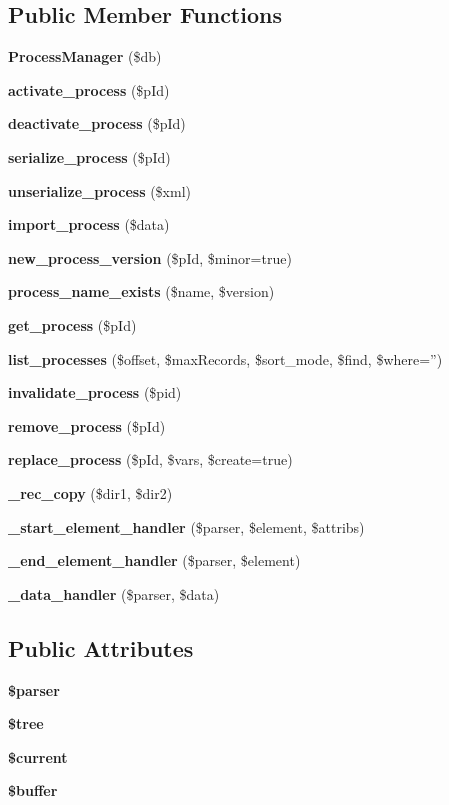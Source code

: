 \subsection*{Public Member Functions}
\begin{CompactItemize}
\item 
{\bf Process\-Manager} (\$db)
\item 
{\bf activate\_\-process} (\$p\-Id)
\item 
{\bf deactivate\_\-process} (\$p\-Id)
\item 
{\bf serialize\_\-process} (\$p\-Id)
\item 
{\bf unserialize\_\-process} (\$xml)
\item 
{\bf import\_\-process} (\$data)
\item 
{\bf new\_\-process\_\-version} (\$p\-Id, \$minor=true)
\item 
{\bf process\_\-name\_\-exists} (\$name, \$version)
\item 
{\bf get\_\-process} (\$p\-Id)
\item 
{\bf list\_\-processes} (\$offset, \$max\-Records, \$sort\_\-mode, \$find, \$where='')
\item 
{\bf invalidate\_\-process} (\$pid)
\item 
{\bf remove\_\-process} (\$p\-Id)
\item 
{\bf replace\_\-process} (\$p\-Id, \$vars, \$create=true)
\item 
{\bf \_\-rec\_\-copy} (\$dir1, \$dir2)\label{classProcessManager_a13}

\item 
{\bf \_\-start\_\-element\_\-handler} (\$parser, \$element, \$attribs)\label{classProcessManager_a14}

\item 
{\bf \_\-end\_\-element\_\-handler} (\$parser, \$element)\label{classProcessManager_a15}

\item 
{\bf \_\-data\_\-handler} (\$parser, \$data)\label{classProcessManager_a16}

\end{CompactItemize}
\subsection*{Public Attributes}
\begin{CompactItemize}
\item 
{\bf \$parser}\label{classProcessManager_o0}

\item 
{\bf \$tree}\label{classProcessManager_o1}

\item 
{\bf \$current}\label{classProcessManager_o2}

\item 
{\bf \$buffer}\label{classProcessManager_o3}

\end{CompactItemize}


